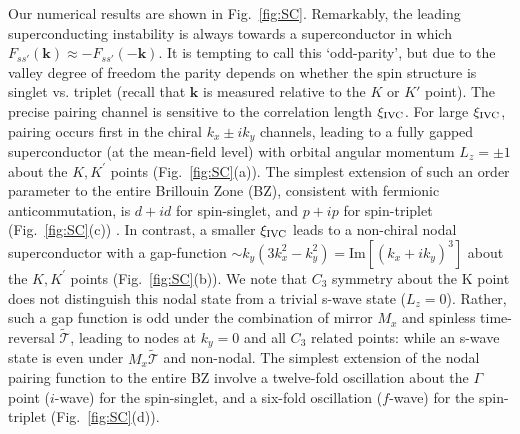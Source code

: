 \documentclass[aps,pra,twocolumn,superscriptaddress,10pt,article,nofootinbib,showpacs,longbibliography]{revtex4-1}
\begin{document}
Our numerical results are shown in Fig.~\ref{fig:SC}.
Remarkably, the leading superconducting instability is always towards a superconductor in which $F_{s s'}(\mathbf{k}) \approx -F_{s s'}(-\mathbf{k})$. 
It is tempting to call this `odd-parity', but due to the valley degree of freedom the parity depends on whether the spin structure is singlet vs. triplet (recall that $\mathbf{k}$ is measured relative to the $K$ or $K'$ point).
The precise pairing channel is sensitive to the correlation length $\xi_{\rm IVC}$.
For large $\xi_{\rm IVC}$, pairing occurs first in the chiral $k_x \pm i k_y$ channels, leading to a fully gapped superconductor (at the mean-field level) with orbital angular momentum $L_z = \pm 1$ about the $K,K^\prime$ points (Fig.~\ref{fig:SC}(a)).
The simplest extension of such an order parameter to the entire Brillouin Zone (BZ), consistent with fermionic anticommutation, is $d + i d$ for spin-singlet, and $p + i p$ for spin-triplet (Fig.~\ref{fig:SC}(c)) \cite{Annica_review,Nandkishore,AnnicaDoniach,Raghu,Lin}.
In contrast, a smaller $\xi_{\rm IVC}$ leads to a non-chiral nodal superconductor with a gap-function $\sim k_y(3k_x^2 - k_y^2) = \text{Im}[(k_x + i k_y)^3]$ about the $K,K^\prime$ points (Fig.~\ref{fig:SC}(b)).
We note that $C_3$ symmetry about the K point does not distinguish this nodal state from a trivial s-wave state ($L_z = 0$). 
Rather, such a gap function is odd under the combination of mirror $M_x$ and spinless time-reversal $\tilde{\mathcal{T}}$, leading to nodes at $k_y = 0$ and all $C_3$ related points: while an s-wave state is even under $M_x \tilde{\mathcal{T}}$ and non-nodal.
The simplest extension of the nodal pairing function to the entire BZ involve a twelve-fold oscillation about the $\Gamma$ point ($i$-wave) for the spin-singlet, and a six-fold oscillation ($f$-wave) for the spin-triplet (Fig.~\ref{fig:SC}(d)).
\end{document}
